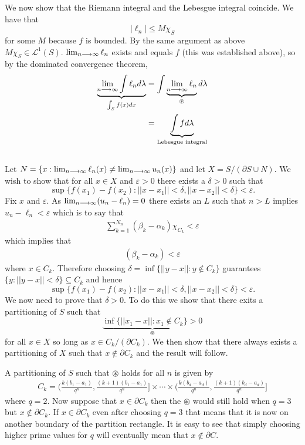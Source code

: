 \documentclass{unswmaths}
\begin{document}
We now show that the Riemann integral and the Lebesgue integral coincide. 
We have that 
$$
    |\ell_n| \leq M \chi_{S} 
$$
for some $ M $ because $ f $ is bounded. By the same argument as above $ M \chi_{S} \in \mathcal{L}^1(S) $. $ \lim_{n\longrightarrow\infty} \ell_n $ exists and equals $ f $ (this was established above), so by the dominated convergence theorem,
\begin{align*}
    \underbrace{\lim_{n\longrightarrow\infty} \int \ell_n d\lambda}_{\int_{S} f(x) dx} &= \int \underbrace{\lim_{n\longrightarrow\infty} \ell_n}_{\circledast} d\lambda \\
    &= \underbrace{\int f d\lambda}_{\text{Lebesgue integral}} \\
\end{align*}

\subsection{}
Let $ N = \{ x : \lim_{n\longrightarrow\infty}\ell_n(x) \neq \lim_{n\longrightarrow\infty}u_n(x) \} $ and
let $ X = S / (\partial S \cup N ) $. 
We wish to show that for all $ x \in X $ and $ \varepsilon > 0 $ there exists a $ \delta > 0 $ such that
$$ \sup\{ f(x_1) - f(x_2) : ||x-x_1|| < \delta, ||x-x_2|| < \delta \} < \varepsilon. $$
Fix $ x $ and $ \varepsilon $. As $ \lim_{n\longrightarrow\infty} (u_n - \ell_n) = 0 $ there exists an $ L $ such that $ n > L $ implies $ u_n - \ell_n < \varepsilon $
which is to say that 
\begin{align*}
    \sum_{k=1}^{N_n} (\beta_k - \alpha_k) \chi_{C_k} < \varepsilon
\end{align*}
which implies that
\begin{align*}
    (\beta_k - \alpha_k) < \varepsilon
\end{align*}
where $ x \in C_k $. Therefore choosing $ \delta = \inf\{ ||y-x|| : y \not\in C_k \} $ guarantees
$ \{ y : ||y - x || < \delta \} \subseteq C_k $ and hence $$ \sup\{ f(x_1) - f(x_2) : ||x-x_1|| < \delta, ||x-x_2|| < \delta \} < \varepsilon. $$
We now need to prove that $ \delta > 0 $. To do this we show that there exits a partitioning of $ S $ such that $$ \underbrace{\inf\{ || x_1 - x || : x_1 \not\in C_k \} > 0}_{\circledast}$$ for all $ x \in X $ so long as $ x \in C_k / (\partial C_k ) $. We then show that there always exists a partitioning of $ X $ such that $ x \not\in \partial C_k $ and the result will follow. 

A partitioning of $ S $ such that $ \circledast $ holds for all $ n $ is given by
\begin{align*}
    C_k = \Big( \frac{k(b_1 - a_1)}{q^n}, \frac{(k+1)(b_1 - a_1)}{q^n}\Big] \times \cdots \times \Big( \frac{k(b_d-a_d)}{q^n}, \frac{(k+1)(b_d-a_d)}{q^n} \Big]
\end{align*}
where $ q = 2 $. Now suppose that $ x \in \partial C_k $ then the $ \circledast $ would still hold when $ q = 3 $ but $ x \not\in \partial C_k $. If $ x \in \partial C_k $ even after choosing $ q = 3 $ that means that it is now on another boundary of the partition rectangle. It is easy to see that simply choosing higher prime values for $ q $ will eventually mean that $ x \not\in \partial C $.
\end{document}
